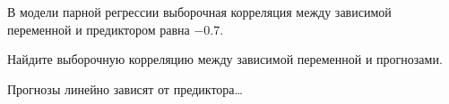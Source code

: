 
\begin{question}
В модели парной регрессии выборочная корреляция между
зависимой переменной и предиктором равна \(-0.7\).

Найдите выборочную корреляцию между зависимой переменной и прогнозами.
\end{question}

\begin{solution}
Прогнозы линейно зависят от предиктора\ldots{}
\end{solution}

